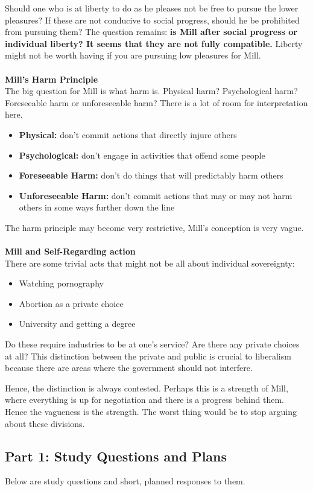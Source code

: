 \documentclass[12pt, letterpaper]{article}
\begin{document}
Should one who is at liberty to do as he pleases not be free to pursue the lower pleasures? If these are not conducive to social progress, should he be prohibited from pursuing them? The question remains: \textbf{is Mill after social progress or individual liberty? It seems that they are not fully compatible.} Liberty might not be worth having if you are pursuing low pleasures for Mill.\\\\
\textbf{Mill's Harm Principle}\\
The big question for Mill is what harm is. Physical harm? Psychological harm? Foreseeable harm or unforeseeable harm? There is a lot of room for interpretation here.
\begin{itemize}
	\item \textbf{Physical:} don't commit actions that directly injure others
	\item \textbf{Psychological:} don't engage in activities that offend some people
	\item \textbf{Foreseeable Harm:} don't do things that will predictably harm others
	\item \textbf{Unforeseeable Harm:} don't commit actions that may or may not harm others in some ways further down the line
\end{itemize}
The harm principle may become very restrictive, Mill's conception is very vague.\\\\
\textbf{Mill and Self-Regarding action}\\
There are some trivial acts that might not be all about individual sovereignty:
\begin{itemize}
	\item Watching pornography
	\item Abortion as a private choice
	\item University and getting a degree
\end{itemize}
Do these require industries to be at one's service? Are there any private choices at all? This distinction between the private and public is crucial to liberalism because there are areas where the government should not interfere.

Hence, the distinction is always contested. Perhaps this is a strength of Mill, where everything is up for negotiation and there is a progress behind them. Hence the vagueness is the strength. The worst thing would be to stop arguing about these divisions. 


\subsection{Part 1: Study Questions and Plans}
Below are study questions and short, planned responses to them.
\end{document}
